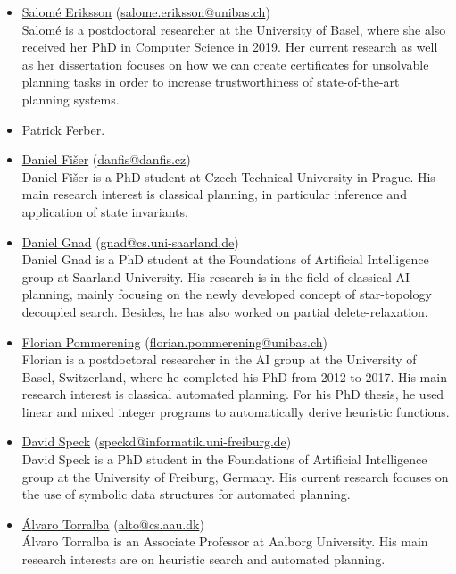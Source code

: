 \documentclass[10pt]{article}
\begin{document}
\begin{itemize}

\item \href{https://ai.dmi.unibas.ch/people/eriksson/}{Salom\'{e} Eriksson}
(\href{mailto:salome.eriksson@unibas.ch}{salome.eriksson@unibas.ch})\\
Salom\'{e} is a postdoctoral researcher at the University of Basel, where she also received
her PhD in Computer Science in 2019. Her current research as well as her
dissertation focuses on how we can create certificates for
unsolvable planning tasks in order to increase trustworthiness of
state-of-the-art planning systems.

\item Patrick Ferber.

\item \href{http://cs.fel.cvut.cz/en/people/fiserdan}{Daniel Fi\v{s}er}
(\href{mailto:danfis@danfis.cz}{danfis@danfis.cz})\\
Daniel Fi\v{s}er is a PhD student at Czech Technical University in Prague.
His main research interest is classical planning, in particular inference and
application of state invariants.

\item \href{http://fai.cs.uni-saarland.de/gnad/}{Daniel Gnad}
(\href{mailto:gnad@cs.uni-saarland.de}{gnad@cs.uni-saarland.de})\\
Daniel Gnad is a PhD student at the Foundations of Artificial
Intelligence group at Saarland University. His research is in the field
of classical AI planning, mainly focusing on the newly developed concept
of star-topology decoupled search. Besides, he has also worked on partial
delete-relaxation.

\item \href{http://ai.cs.unibas.ch/people/pommeren}{Florian Pommerening}
   (\href{mailto:florian.pommerening@unibas.ch}{florian.pommerening@unibas.ch})\\
  Florian is a postdoctoral researcher in the AI group at the University of Basel,
  Switzerland, where he completed his PhD from 2012 to 2017. His main
  research interest is classical automated planning. For his PhD
  thesis, he used linear and mixed integer programs to
  automatically derive heuristic functions.

\item \href{http://www.informatik.uni-freiburg.de/~speckd/}{David Speck}
(\href{mailto:speckd@informatik.uni-freiburg.de}{speckd@informatik.uni-freiburg.de})\\
David Speck is a PhD student in the Foundations of Artificial Intelligence
group at the University of Freiburg, Germany. His current research focuses on
the use of symbolic data structures for automated planning.

\item \href{https://people.cs.aau.dk/~alto/}{{\'A}lvaro Torralba}
  (\href{mailto:alto@cs.aau.dk}{alto@cs.aau.dk})\\ \'Alvaro Torralba is an Associate
  Professor at Aalborg University. His main research interests are on heuristic search and
  automated planning.


\end{itemize}
\end{document}
